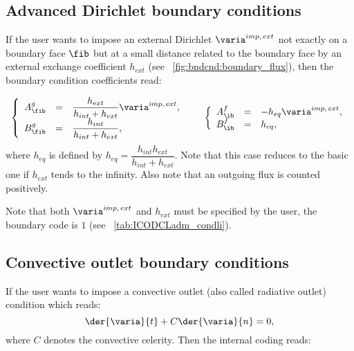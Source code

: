 \subsection{Advanced Dirichlet boundary conditions}
If the user wants to impose an external Dirichlet $\varia^{imp, \, ext}$ not exactly on a boundary face $\fib$ but at a small distance
related to the boundary face by an external exchange coefficient $h_{ext}$
(see \figurename~\ref{fig:bndcnd:boundary_flux}), then  the boundary condition coefficients read:

\begin{equation}
\begin{array}{r c l}
\left\lbrace
\begin{array}{r c l}
A^g_\fib & = &\dfrac{h_{ext}}{h_{int}+h_{ext}} \varia^{imp, \, ext}, \\
B^g_\fib & = & \dfrac{h_{int}}{h_{int}+h_{ext}} ,
\end{array}
\right.
& &
\left\lbrace
\begin{array}{r c l}
A^f_\ib & = & -h_{eq} \varia^{imp, \, ext} , \\
B^f_\ib & = & h_{eq},
\end{array}
\right.
\end{array}
\end{equation}
where $h_{eq} $ is defined by $h_{eq}=\dfrac{h_{int} h_{ext}}{ h_{int} + h_{ext}}$.
Note that this case reduces to the basic one if $h_{ext}$ tends to the infinity.
Also note that an outgoing flux is counted positively.

\begin{remark}
Note that both $\varia^{imp, \, ext} $ and $ h_{ext} $ must be specified by the user, the boundary code is $1$ (see \tablename~\ref{tab:ICODCLadm_condli}).
\end{remark}

\subsection{Convective outlet boundary conditions}

If the user wants to impose a convective outlet (also called radiative outlet) condition which reads:
\begin{equation}
\der{ \varia}{ t} + C \der{ \varia}{ n} = 0,
\end{equation}
where $C$ denotes the convective celerity. Then the internal coding reads:

